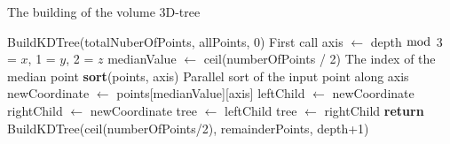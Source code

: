 \begin{algorithm}
\caption{The building of the volume 3D-tree}
\label{volume_kdtree_build}
\begin{algorithmic}
\State BuildKDTree(totalNuberOfPoints, allPoints, 0) \Comment First call
  \State axis $\gets$ depth $\bmod$ 3  = $x$, 1 = $y$, 2 = $z$
  \State medianValue $\gets$ ceil(numberOfPoints / 2) \Comment The index of the median point
  \State \textbf{sort}(points, axis) \Comment Parallel sort of the input point along axis
  \State newCoordinate $\gets$ points[medianValue][axis]
  \State leftChild $\gets$ newCoordinate
  \State rightChild $\gets$ newCoordinate
  \State tree $\gets$ leftChild
  \State tree $\gets$ rightChild
  \State \textbf{return} \small{BuildKDTree(ceil(numberOfPoints/2), remainderPoints, depth+1)}
  \EndIf
\EndProcedure
\end{algorithmic}
\end{algorithm}

